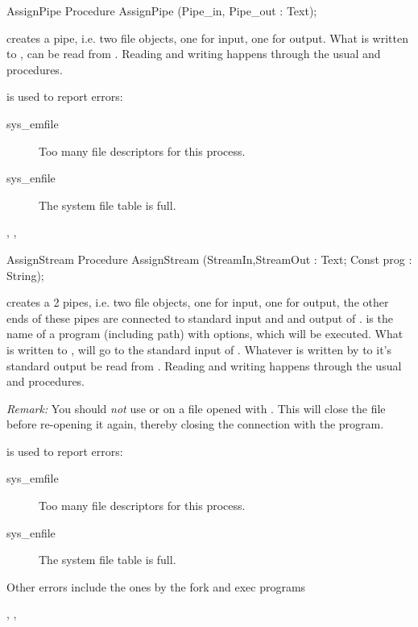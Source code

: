 \latex{}
\html{}
\begin{procedure}{AssignPipe}
\Declaration
Procedure AssignPipe (Pipe\_in, Pipe\_out : Text);

\Description
{} creates a pipe, i.e. two file objects, one for input, one for output.
What is written to , can be read from .
Reading and writing happens through the usual  and
 procedures.

\Errors
  is used to report errors:
\begin{description}
\item[sys\_emfile] Too many file descriptors for this process.
\item[sys\_enfile] The system file table is full.
\end{description}

\SeeAlso
{}, , 
\end{procedure}
\latex{}
\html{}
\begin{procedure}{AssignStream}
\Declaration
Procedure AssignStream (StreamIn,StreamOut : Text; Const prog : String);

\Description
{} creates a 2 pipes, i.e. two file objects, one for input, one for
output, the other ends of these pipes are connected to standard input and and
output of .  is the name of a program (including path)
with options, which will be executed.
What is written to , will go to the standard input of
. Whatever is written by  to it's standard output be read from
.
Reading and writing happens through the usual  and
 procedures.

{\em Remark:} You should {\em not} use  or  on a 
file opened with . This will close the file before re-opening 
it again, thereby closing the connection with the program.

\Errors
  is used to report errors:
\begin{description}
\item[sys\_emfile] Too many file descriptors for this process.
\item[sys\_enfile] The system file table is full.
\end{description}
Other errors include the ones by the fork and exec programs

\SeeAlso
{}, ,
\end{procedure}
